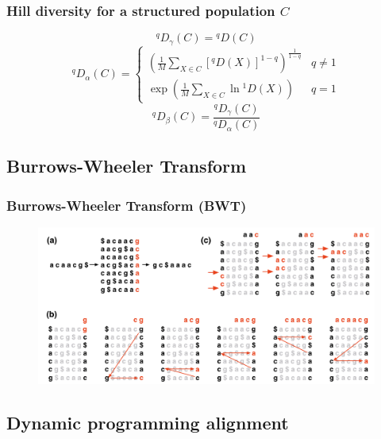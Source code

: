 \documentclass[presentation]{beamer}
\begin{document}
\begin{frame}
\frametitle{Hill diversity for a structured population $C$}

\begin{equation*}
^qD_\gamma(C) = {}^qD(C)
\end{equation*}
\vfill
\begin{equation*}
^qD_\alpha(C) = \begin{cases} \left(\displaystyle\frac{1}{M}\sum_{X \in C} \left[{}^qD(X)\right]^{1-q}\right)^{\frac{1}{1-q}} & q \neq 1\\
\exp\left(\displaystyle\frac{1}{M}\sum_{X \in C} \ln {}^1D(X)\right) & q = 1 \end{cases}
\end{equation*}
\vfill
\begin{equation*}
^qD_\beta(C) = \frac{^qD_\gamma(C)}{^qD_\alpha(C)}
\end{equation*}
\end{frame}

\subsection{Burrows-Wheeler Transform}

\begin{frame}
\frametitle{Burrows-Wheeler Transform (BWT)}
\begin{figure}
\includegraphics[width=\textwidth]{figs/png/bwt}
\end{figure}
\end{frame}

\subsection{Dynamic programming alignment}
\end{document}
